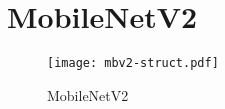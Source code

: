 \chapter{MobileNetV2} \label{appendix:mbv2}
%
\begin{figure}[H]
    \texttt{[image: mbv2-struct.pdf]}
    \caption{MobileNetV2}
\end{figure}
\newpage
